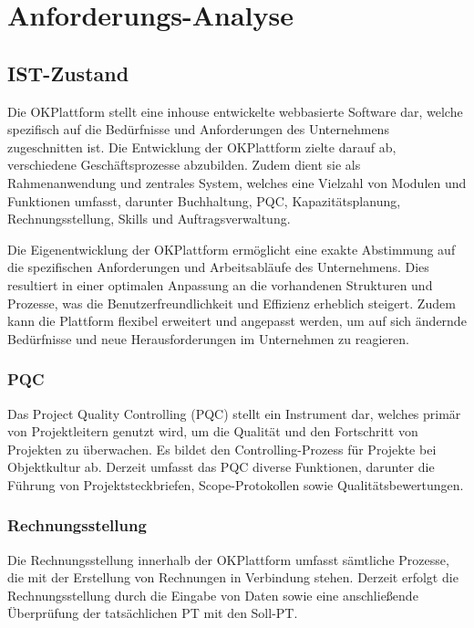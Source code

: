 \chapter{Anforderungs-Analyse}

\section{IST-Zustand}

Die OKPlattform stellt eine inhouse entwickelte webbasierte Software dar, welche spezifisch auf die Bedürfnisse und Anforderungen des Unternehmens zugeschnitten ist. Die Entwicklung der OKPlattform zielte darauf ab, verschiedene Geschäftsprozesse abzubilden. Zudem dient sie als Rahmenanwendung und zentrales System, welches eine Vielzahl von Modulen und Funktionen umfasst, darunter Buchhaltung, PQC, Kapazitätsplanung, Rechnungsstellung, Skills und Auftragsverwaltung.

Die Eigenentwicklung der OKPlattform ermöglicht eine exakte Abstimmung auf die spezifischen Anforderungen und Arbeitsabläufe des Unternehmens. Dies resultiert in einer optimalen Anpassung an die vorhandenen Strukturen und Prozesse, was die Benutzerfreundlichkeit und Effizienz erheblich steigert. Zudem kann die Plattform flexibel erweitert und angepasst werden, um auf sich ändernde Bedürfnisse und neue Herausforderungen im Unternehmen zu reagieren.

\subsection{PQC}

Das Project Quality Controlling (PQC) stellt ein Instrument dar, welches primär von Projektleitern genutzt wird, um die Qualität und den Fortschritt von Projekten zu überwachen. Es bildet den Controlling-Prozess für Projekte bei Objektkultur ab.
Derzeit umfasst das PQC diverse Funktionen, darunter die Führung von Projektsteckbriefen, Scope-Protokollen sowie Qualitätsbewertungen.

\subsection{Rechnungsstellung}

Die Rechnungsstellung innerhalb der OKPlattform umfasst sämtliche Prozesse, die mit der Erstellung von Rechnungen in Verbindung stehen. Derzeit erfolgt die Rechnungsstellung durch die Eingabe von Daten sowie eine anschließende Überprüfung der tatsächlichen PT mit den Soll-PT.

